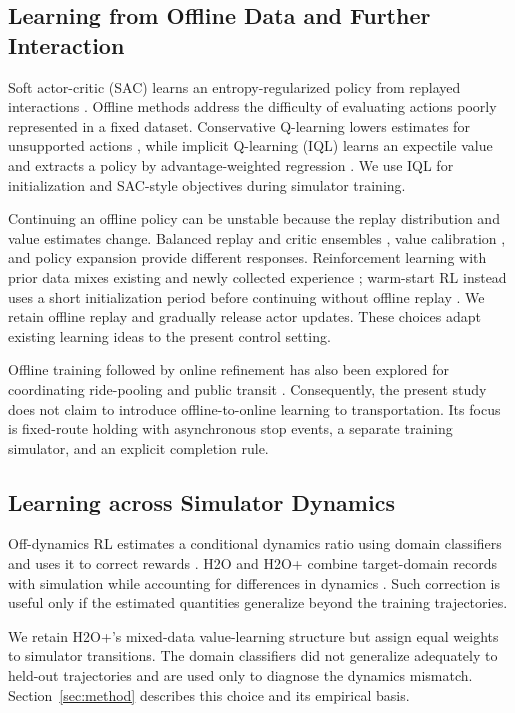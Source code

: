 \documentclass[letterpaper,journal]{IEEEtran}
\begin{document}
\subsection{Learning from Offline Data and Further Interaction}
Soft actor-critic (SAC) learns an entropy-regularized policy from replayed interactions \cite{haarnoja2018soft,haarnoja2018applications}. Offline methods address the difficulty of evaluating actions poorly represented in a fixed dataset. Conservative Q-learning lowers estimates for unsupported actions \cite{kumar2020cql}, while implicit Q-learning (IQL) learns an expectile value and extracts a policy by advantage-weighted regression \cite{kostrikov2022iql}. We use IQL for initialization and SAC-style objectives during simulator training.

Continuing an offline policy can be unstable because the replay distribution and value estimates change. Balanced replay and critic ensembles \cite{lee2022balanced}, value calibration \cite{nakamoto2023calql}, and policy expansion \cite{zhang2023pex} provide different responses. Reinforcement learning with prior data mixes existing and newly collected experience \cite{ball2023efficient}; warm-start RL instead uses a short initialization period before continuing without offline replay \cite{zhou2025wsrl}. We retain offline replay and gradually release actor updates. These choices adapt existing learning ideas to the present control setting.

Offline training followed by online refinement has also been explored for coordinating ride-pooling and public transit \cite{hu2025rgcql}. Consequently, the present study does not claim to introduce offline-to-online learning to transportation. Its focus is fixed-route holding with asynchronous stop events, a separate training simulator, and an explicit completion rule.

\subsection{Learning across Simulator Dynamics}
Off-dynamics RL estimates a conditional dynamics ratio using domain classifiers and uses it to correct rewards \cite{eysenbach2021off}. H2O and H2O+ combine target-domain records with simulation while accounting for differences in dynamics \cite{niu2022h2o,niu2025h2oplus}. Such correction is useful only if the estimated quantities generalize beyond the training trajectories.

We retain H2O+'s mixed-data value-learning structure but assign equal weights to simulator transitions. The domain classifiers did not generalize adequately to held-out trajectories and are used only to diagnose the dynamics mismatch. Section~\ref{sec:method} describes this choice and its empirical basis.
\end{document}
